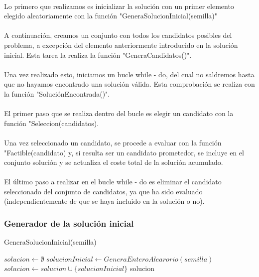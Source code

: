 \documentclass{article}
\begin{document}
		\paragraph{}Lo primero que realizamos es inicializar la solución con un primer elemento elegido aleatoriamente con la función "GeneraSolucionInicial(semilla)"
		
		\paragraph{}A continuación, creamos un conjunto con todos los candidatos posibles del problema, a excepción del elemento anteriormente introducido en la solución inicial. Esta tarea la realiza la función "GeneraCandidatos()".
		
		\paragraph{}Una vez realizado esto, iniciamos un bucle while - do, del cual no saldremos hasta que no hayamos encontrado una solución válida. Esta comprobación se realiza con la función "SoluciónEncontrada()".
		
		\paragraph{}El primer paso que se realiza dentro del bucle es elegir un candidato con la función "Seleccion(candidatos).
		
		\paragraph{}Una vez seleccionado un candidato, se procede a evaluar con la función "Factible(candidato) y, si resulta ser un candidato prometedor, se incluye en el conjunto solución y se actualiza el coste total de la solución acumulado.
		
		\paragraph{}El último paso a realizar en el bucle while - do es eliminar el candidato seleccionado del conjunto de candidatos, ya que ha sido evaluado (independientemente de que se haya incluido en la solución o no).
	
	

	\subsubsection{Generador de la solución inicial}
		\begin{algorithm}[H]
			\caption{GeneraSolucionInicial(semilla)}
			\begin{algorithmic}
				\STATE $solucion \leftarrow \emptyset$
				\STATE $solucionInicial \leftarrow GeneraEnteroAlearorio(semilla)$
				\STATE $solucion \leftarrow solucion \cup \{solucionInicial\}$
				\RETURN solucion
			\end{algorithmic}
		\end{algorithm}
	
\end{document}
